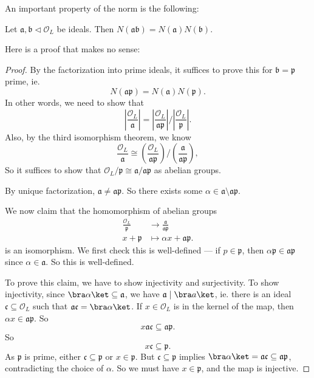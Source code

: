 \documentclass[a4paper]{article}
\begin{document}
An important property of the norm is the following:
\begin{prop}
  Let $\mathfrak{a}, \mathfrak{b} \lhd \mathcal{O}_L$ be ideals. Then $N(\mathfrak{a} \mathfrak{b}) = N(\mathfrak{a})N(\mathfrak{b})$.
\end{prop}

Here is a proof that makes no sense:
\begin{proof}
  By the factorization into prime ideals, it suffices to prove this for $\mathfrak{b} = \mathfrak{p}$ prime, ie.
  \[
    N(\mathfrak{a}\mathfrak{p}) = N(\mathfrak{a}) N(\mathfrak{p}).
  \]
  In other words, we need to show that
  \[
    \left|\frac{\mathcal{O}_L}{\mathfrak{a}}\right| = \left|\frac{\mathcal{O}_L}{\mathfrak{a}\mathfrak{p}}\right|\Big/ \left|\frac{\mathcal{O}_L}{\mathfrak{p}}\right|.
  \]
  Also, by the third isomorphism theorem, we know
  \[
    \frac{\mathcal{O}_L}{\mathfrak{a}} \cong \left(\frac{\mathcal{O}_L}{\mathfrak{a}\mathfrak{p}}\right) \big/ \left(\frac{\mathfrak{a}}{\mathfrak{a}\mathfrak{p}}\right),
  \]
  So it suffices to show that $\mathcal{O}_L/\mathfrak{p} \cong \mathfrak{a}/\mathfrak{a}\mathfrak{p}$ as abelian groups.

  By unique factorization, $\mathfrak{a} \not= \mathfrak{a} \mathfrak{p}$. So there exists some $\alpha \in \mathfrak{a} \setminus \mathfrak{a} \mathfrak{p}$.

  We now claim that the homomorphism of abelian groups
  \begin{align*}
    \frac{\mathcal{O}_L}{\mathfrak{p}} &\to \frac{\mathfrak{a}}{\mathfrak{a}\mathfrak{p}}\\
    x + \mathfrak{p} &\mapsto \alpha x + \mathfrak{a}\mathfrak{p}.
  \end{align*}
  is an isomorphism. We first check this is well-defined --- if $p \in \mathfrak{p}$, then $\alpha \mathfrak{p} \in \mathfrak{a} \mathfrak{p}$ since $\alpha \in \mathfrak{a}$. So this is well-defined.

  To prove this claim, we have to show injectivity and surjectivity. To show injectivity, since $\bra \alpha\ket \subseteq \mathfrak{a}$, we have $\mathfrak{a} \mid \bra a\ket$, ie. there is an ideal $\mathfrak{c} \subseteq \mathcal{O}_L$ such that $\mathfrak{a}\mathfrak{c} = \bra \alpha\ket$. If $x \in \mathcal{O}_L$ is in the kernel of the map, then $\alpha x \in \mathfrak{a}\mathfrak{p}$. So
  \[
    x \mathfrak{a}\mathfrak{c} \subseteq \mathfrak{a}\mathfrak{p}.
  \]
  So
  \[
    x\mathfrak{c} \subseteq \mathfrak{p}.
  \]
  As $\mathfrak{p}$ is prime, either $\mathfrak{c} \subseteq \mathfrak{p}$ or $x \in \mathfrak{p}$. But $\mathfrak{c} \subseteq \mathfrak{p}$ implies $\bra \alpha\ket = \mathfrak{a}\mathfrak{c} \subseteq \mathfrak{a}\mathfrak{p}$, contradicting the choice of $\alpha$. So we must have $x \in \mathfrak{p}$, and the map is injective.


\end{proof}
\end{document}
